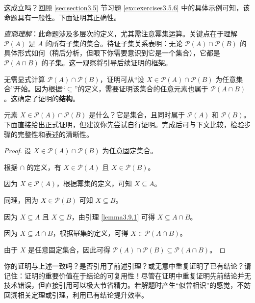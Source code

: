 这成立吗？回顾 \ref{sec:section3.5} 节习题 \ref{exc:exercises3.5.6} 中的具体示例可知，该命题具有一般性。下面证明其正确性。

\emph{直观理解}：此命题涉及多层次的定义，尤其需注意幂集运算。关键点在于理解 $\mathcal{P}(A)$ 是 $A$ 的所有子集的集合。待证子集关系表明：无论 $\mathcal{P}(A) \cap \mathcal{P}(B)$ 的具体形式如何（稍后分析，但眼下你需要意识到它是一个集合），它都是 $\mathcal{P}(A \cap B)$ 的子集。这一观察将引导后续证明的框架。

无需显式计算 $\mathcal{P}(A) \cap \mathcal{P}(B)$，证明可从``设 $X \in \mathcal{P}(A) \cap \mathcal{P}(B)$ 为任意集合''开始。因为根据``$\subseteq$''的定义，需要证明该集合的任意元素也属于 $\mathcal{P}(A \cap B)$。这确定了证明的\textbf{结构}。

元素 $X \in \mathcal{P}(A) \cap \mathcal{P}(B)$ 是什么？它是集合，且同时属于 $\mathcal{P}(A)$ 和 $\mathcal{P}(B)$。下面直接给出正式证明，但建议你先尝试自行证明。完成后可与下文比较，检验步骤的完整性和表述的清晰性。

\begin{proof}
    设 $X \in \mathcal{P}(A) \cap \mathcal{P}(B)$ 为任意固定集合。

    根据 $\cap$ 的定义，有 $X \in \mathcal{P}(A)$ 且 $X \in \mathcal{P}(B)$。

    因为 $X \in \mathcal{P}(A)$，根据幂集的定义，可知 $X \subseteq A$。

    同理，因为 $X \in \mathcal{P}(B)$ 可知 $X \subseteq B$。

    因为 $X \subseteq A$ 且 $X \subseteq B$，由引理 \ref{lemma3.9.1} 可得 $X \subseteq A \cap B$。

    因为 $X \subseteq A \cap B$，根据幂集的定义，可得 $X \in \mathcal{P}(A \cap B)$。

    由于 $X$ 是任意固定集合，因此可得 $\mathcal{P}(A) \cap \mathcal{P}(B) \subseteq \mathcal{P}(A \cap B)$。
\end{proof}

你的证明与上述一致吗？是否引用了前述引理？或无意中重复证明了已有结论？请记住：证明的重要价值在于结论的可复用性！尽管在证明中重复证明先前结论并无技术错误，但直接引用可以极大节省精力。若解题时产生``似曾相识''的感觉，不妨回溯相关定理或引理，利用已有结论提升效率。
